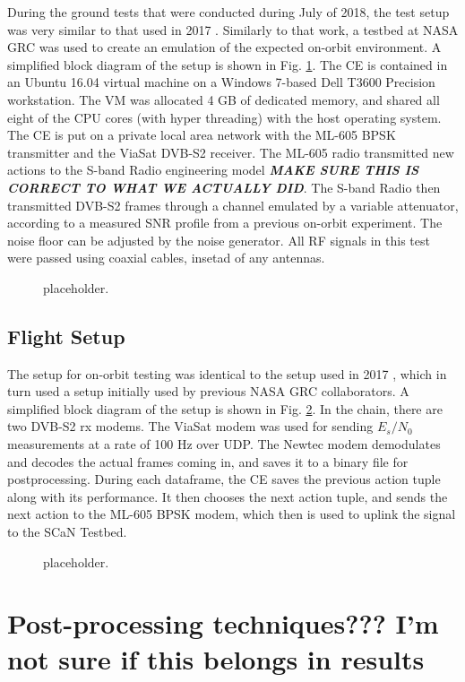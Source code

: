 \par During the ground tests that were conducted during July of 2018, the test setup was very similar to that used in 2017 \cite{tim_implementation}.  Similarly to that work, a testbed at NASA GRC was used to create an emulation of the expected on-orbit environment. A simplified block diagram of the setup is shown in Fig. \ref{methods:groundTestFig}. The CE is contained in an Ubuntu 16.04 virtual machine on a Windows 7-based Dell T3600 Precision workstation. The VM was allocated 4 GB of dedicated memory, and shared all eight of the CPU cores (with hyper threading) with the host operating system. The CE is put on a private local area network with the ML-605 BPSK transmitter and the ViaSat DVB-S2 receiver. The ML-605 radio transmitted new actions to the S-band Radio engineering model \textbf{\textit{MAKE SURE THIS IS CORRECT TO WHAT WE ACTUALLY DID}}. The S-band Radio then transmitted DVB-S2 frames through a channel emulated by a variable attenuator, according to a measured SNR profile from a previous on-orbit experiment. The noise floor can be adjusted by the noise generator. All RF signals in this test were passed using coaxial cables, insetad of any antennas.
\begin{figure}[ht]
\caption{placeholder.}\label{methods:groundTestFig}
\end{figure} 

\subsection{Flight Setup}
\par The setup for on-orbit testing was identical to the setup used in 2017 \cite{tim_implementation}, which in turn used a setup initially used by previous NASA GRC collaborators. A simplified block diagram of the setup is shown in Fig. \ref{methods:flightTestFig}. In the chain, there are two DVB-S2 rx modems. The ViaSat modem was used for sending $E_s/N_0$ measurements at a rate of 100 Hz over UDP. The Newtec modem demodulates and decodes the actual frames coming in, and saves it to a binary file for postprocessing. During each dataframe, the CE saves the previous action tuple along with its performance. It then chooses the next action tuple, and sends the next action to the ML-605 BPSK modem, which then is used to uplink the signal to the SCaN Testbed.

\begin{figure}[ht]
\caption{placeholder.}\label{methods:flightTestFig}
\end{figure} 

\section{Post-processing techniques??? I'm not sure if this belongs in results}
